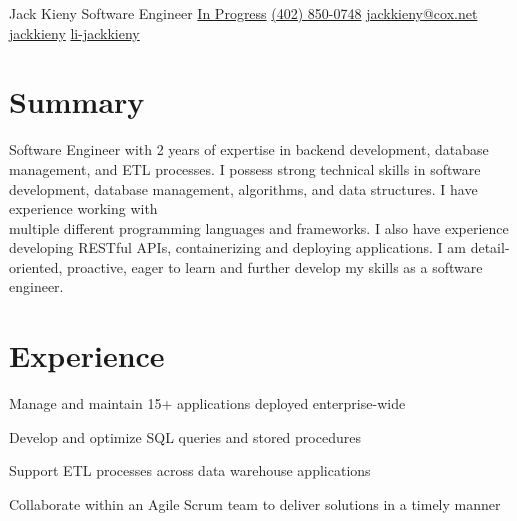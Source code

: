 \documentclass[]{latex/resume}
\begin{document}
%
%

\namesection
    {Jack}
    {Kieny}
    {Software Engineer}
    {\contactline
        {\href{}{In Progress}}
        {\href{tel:+1402850047}{(402) 850-0748}}
        {\href{mailto:jackkieny@cox.net}{jackkieny@cox.net}}
        {\href{https://www.github.com/jackkieny}{jackkieny}}
        {\href{https://www.linkedin.com/in/jackkieny}{li-jackkieny}}
    }       
        

%
%

\begin{minipage}[t]{0.75\textwidth} 

\section{Summary}
Software Engineer with 2 years of expertise in backend development, database\\management, and ETL processes.
I possess strong technical skills in software development, database management, algorithms, and data structures.
I have experience working with\\multiple different programming languages and frameworks.
I also have experience developing RESTful APIs, containerizing and deploying applications.
I am detail-oriented, proactive, eager to learn and further develop my skills as a software engineer.

\sectionsep


\section{Experience}
     
    \vspace{\topsep} %
    \begin{tightemize}
        \sectionsep
            \item Manage and maintain 15+ applications deployed enterprise-wide
            \item Develop and optimize SQL queries and stored procedures
            \item Support ETL processes across data warehouse applications
            \item Collaborate within an Agile Scrum team to deliver solutions in a timely manner
        \end{tightemize}
    

\end{minipage}
\end{document}
